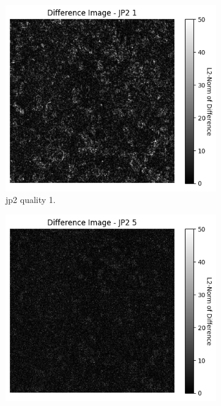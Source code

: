 \begin{figure}[htb]
    \centering
        \begin{subfigure}[b]{0.49\textwidth}
            \centering
            \includegraphics[width=\textwidth]{doc/thesis/0_figures/compare_quality/set1/jp2_1_center_diff_heatmap.png}
            \caption{\gls{jp2} quality 1.}
            \label{fig:img_quality_center_heatmap_1}
        \end{subfigure}
        \begin{subfigure}[b]{0.49\textwidth}
            \centering
            \includegraphics[width=\textwidth]{doc/thesis/0_figures/compare_quality/set1/jp2_5_center_diff_heatmap.png}

\end{subfigure}
\end{figure}
